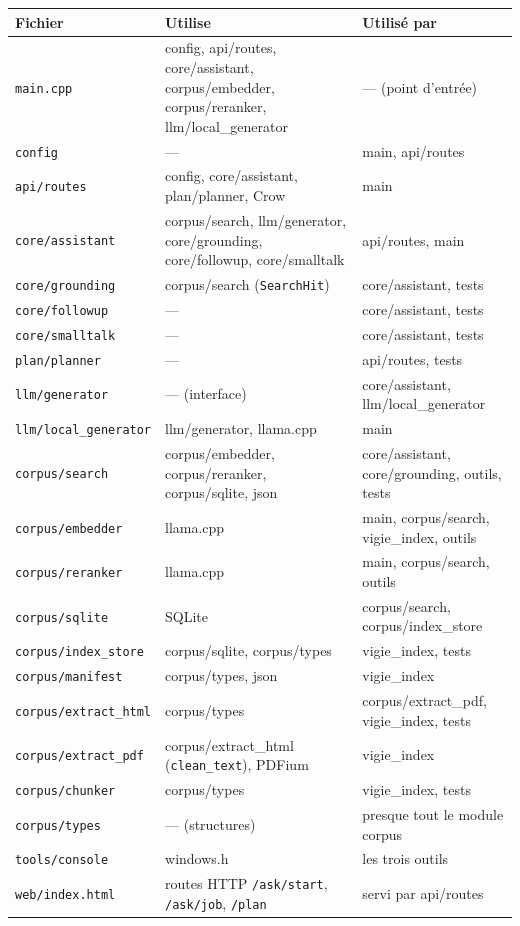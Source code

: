 \documentclass[11pt,a4paper]{article}
\newcommand{\fichier}[1]{\texttt{#1}}
\begin{document}
\begin{center}
\small
\begin{longtable}{@{}p{3.6cm} p{5.2cm} p{5.6cm}@{}}
\toprule
Fichier & Utilise & Utilisé par \\
\midrule
\endhead
\fichier{main.cpp} & config, api/routes, core/assistant, corpus/embedder, corpus/reranker, llm/local\_generator & --- (point d'entrée) \\
\fichier{config} & --- & main, api/routes \\
\fichier{api/routes} & config, core/assistant, plan/planner, Crow & main \\
\fichier{core/assistant} & corpus/search, llm/generator, core/grounding, core/followup, core/smalltalk & api/routes, main \\
\fichier{core/grounding} & corpus/search (\texttt{SearchHit}) & core/assistant, tests \\
\fichier{core/followup} & --- & core/assistant, tests \\
\fichier{core/smalltalk} & --- & core/assistant, tests \\
\fichier{plan/planner} & --- & api/routes, tests \\
\fichier{llm/generator} & --- (interface) & core/assistant, llm/local\_generator \\
\fichier{llm/local\_generator} & llm/generator, llama.cpp & main \\
\fichier{corpus/search} & corpus/embedder, corpus/reranker, corpus/sqlite, json & core/assistant, core/grounding, outils, tests \\
\fichier{corpus/embedder} & llama.cpp & main, corpus/search, vigie\_index, outils \\
\fichier{corpus/reranker} & llama.cpp & main, corpus/search, outils \\
\fichier{corpus/sqlite} & SQLite & corpus/search, corpus/index\_store \\
\fichier{corpus/index\_store} & corpus/sqlite, corpus/types & vigie\_index, tests \\
\fichier{corpus/manifest} & corpus/types, json & vigie\_index \\
\fichier{corpus/extract\_html} & corpus/types & corpus/extract\_pdf, vigie\_index, tests \\
\fichier{corpus/extract\_pdf} & corpus/extract\_html (\texttt{clean\_text}), PDFium & vigie\_index \\
\fichier{corpus/chunker} & corpus/types & vigie\_index, tests \\
\fichier{corpus/types} & --- (structures) & presque tout le module corpus \\
\fichier{tools/console} & windows.h & les trois outils \\
\fichier{web/index.html} & routes HTTP \texttt{/ask/start}, \texttt{/ask/job}, \texttt{/plan} & servi par api/routes \\
\bottomrule
\end{longtable}
\end{center}
\end{document}
